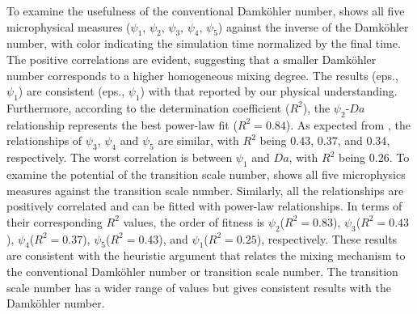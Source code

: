\documentclass[draft,linenumbers]{AGUJournal}
\begin{document}
To examine the usefulness of the conventional Damk\"{o}hler number, 
 shows all five microphysical measures ($\psi_1$, $\psi_2$, $\psi_3$, $\psi_4$, $\psi_5$) against the inverse of the Damk\"{o}hler number, with color indicating the simulation time normalized by the final time. The positive correlations are evident, suggesting that a smaller Damk\"{o}hler number corresponds to a higher homogeneous mixing degree. The results (eps., $\psi_1$) are consistent (eps., $\psi_1$) with that reported by \citet{And09} our physical understanding. Furthermore, according to the determination coefficient ($R^2$), the $\psi_2$-$Da$ relationship represents the best power-law fit ($R^2 = 0.84$). As expected from , the relationships of $\psi_3$, $\psi_4$ and $\psi_5$ are similar, with $R^2$ being $0.43$, $0.37$, and $0.34$, respectively. The worst correlation is between $\psi_1$ and $Da$, with $R^2$ being $0.26$. To examine the potential of the transition scale number,  shows all five microphysics measures against the transition scale number. Similarly, all the relationships are positively correlated and can be fitted with power-law relationships. In terms of their corresponding $R^2$ values, the order of fitness is $\psi_2$($R^2 = 0.83$), $\psi_3$($R^2 = 0.43$), $\psi_4$($R^2=0.37$), $\psi_5$($R^2=0.43$), and $\psi_1$($R^2 = 0.25$), respectively. These results are consistent with the heuristic argument that relates the mixing mechanism to the conventional Damk\"{o}hler number or transition scale number. The transition scale number has a wider range of values but gives consistent results with the Damk\"ohler number.
\end{document}
